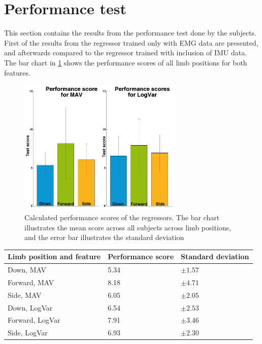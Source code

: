 \section{Performance test}
This section contains the results from the performance test done by the subjects. First of the results from the regressor trained only with EMG data are presented, and afterwards compared to the regressor trained with inclusion of IMU data. The bar chart in \ref{fig:GotItTime} shows the performance scores of all limb positions for both features.

\begin{figure}[H]
	\includegraphics[width=0.7\textwidth]{figures/results/GotItTime}  %
	\caption{Calculated performance scores of the regressors. The bar chart illustrates the mean score across all subjects across limb positions, and the error bar illustrates the standard deviation}
	\label{fig:GotItTime}  %
\end{figure}

	\begin{center}
		\begin{tabular}{l l l}
			\toprule
			\textbf{Limb position and feature} & \textbf{Performance score} & \textbf{Standard deviation}\\
			\midrule
			Down, MAV & 5.34 & $\pm 1.57$ \\
			Forward, MAV & 8.18 & $\pm 4.71$ \\
			Side, MAV & 6.05 & $\pm 2.05$ \\
			Down, LogVar & 6.54 & $\pm 2.53$ \\
			Forward, LogVar & 7.91 & $\pm 3.46$ \\
			Side, LogVar & 6.93 & $\pm 2.30$ \\
			\bottomrule
		\end{tabular}
	\end{center}
	
